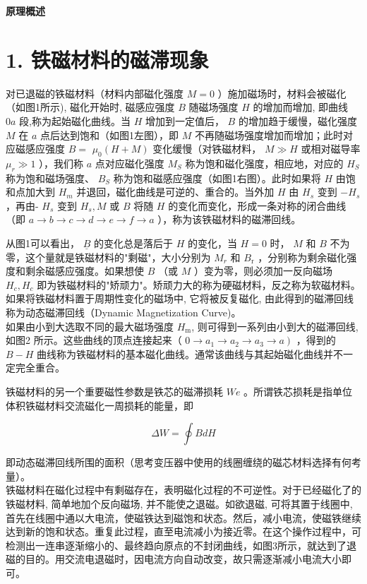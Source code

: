 \documentclass[dvipsnames, svgnames,a4paper,11pt]{article}
\begin{document}
\textbf{原理概述}
\section*{1. 铁磁材料的磁滞现象}
对已退磁的铁磁材料（材料内部磁化强度 $M=0$ ）施加磁场时，材料会被磁化（如图1所示), 磁化开始时, 磁感应强度 $B$ 随磁场强度 $H$ 的增加而增加, 即曲线 $0 a$ 段,称为起始磁化曲线。当 $H$ 增加到一定值后， $B$ 的增加趋于缓慢，磁化强度 $M$ 在 $a$ 点后达到饱和（如图1左图），即 $M$ 不再随磁场强度增加而增加；此时对应磁感应强度 $B=$ $\mu_{0}(H+M)$ 变化缓慢（对铁磁材料， $M \gg H$ 或相对磁导率 $\mu_{r} \gg 1$ ），我们称 $a$ 点对应磁化强度 $M_{S}$ 称为饱和磁化强度，相应地，对应的 $H_{S}$ 称为饱和磁场强度、 $B_{S}$ 称为饱和磁感应强度（如图1右图）。此时如果将 $H$ 由饱和点加大到 $H_{m}$ 并退回，磁化曲线是可逆的、重合的。当外加 $H$ 由 $H_{s}$ 变到 $-H_{s}$ ，再由- $H_{s}$ 变到 $H_{s}, M$ 或 $B$ 将随 $H$ 的变化而变化，形成一条对称的闭合曲线（即 $a \rightarrow b \rightarrow c \rightarrow d \rightarrow e \rightarrow f \rightarrow a$ ），称为该铁磁材料的磁滞回线。

从图1可以看出， $\underline{B}$ 的变化总是落后于 $H$ 的变化，当 $H=0$ 时， $M$ 和 $B$ 不为零，这个量就是铁磁材料的"剩磁"，大小分别为 $M_{r}$ 和 $B_{\mathrm{r}}$ ，分别称为剩余磁化强度和剩余磁感应强度。如果想使 $B$ （或 $M$ ）变为零，则必须加一反向磁场 $H_{c}, H_{c}$ 即为铁磁材料的"矫顽力"。矫顽力大的称为硬磁材料，反之称为软磁材料。如果将铁磁材料置于周期性变化的磁场中, 它将被反复磁化, 由此得到的磁滞回线称为动态磁滞回线（Dynamic Magnetization Curve)。\\



如果由小到大选取不同的最大磁场强度 $H_{\mathrm{m}}$, 则可得到一系列由小到大的磁滞回线,如图2 所示。这些曲线的顶点连接起来（ $\left.0 \rightarrow a_{1} \rightarrow a_{2} \rightarrow a_{3} \rightarrow a\right)$ ，得到的 $B-H$ 曲线称为铁磁材料的基本磁化曲线。通常该曲线与其起始磁化曲线并不一定完全重合。

铁磁材料的另一个重要磁性参数是铁芯的磁滞损耗 $W e$ 。所谓铁芯损耗是指单位体积铁磁材料交流磁化一周损耗的能量，即

$$
\Delta W=\oint B d H
$$

即动态磁滞回线所围的面积（思考变压器中使用的线圈缠绕的磁芯材料选择有何考量）。\\
铁磁材料在磁化过程中有剩磁存在，表明磁化过程的不可逆性。对于已经磁化了的铁磁材料, 简单地加个反向磁场, 并不能使之退磁。如欲退磁, 可将其置于线圈中,首先在线圈中通以大电流，使磁铁达到磁饱和状态。然后，减小电流，使磁铁继续达到新的饱和状态。重复此过程，直至电流减小为接近零。在这个操作过程中，可检测出一连串逐渐缩小的、最终趋向原点的不封闭曲线，如图3所示，就达到了退磁的目的。用交流电退磁时，因电流方向自动改变，故只需逐渐减小电流大小即可。\\
\end{document}
